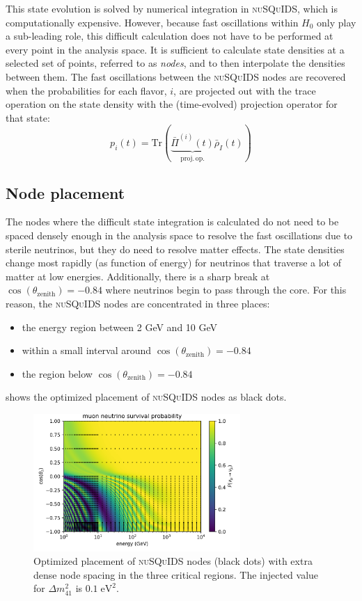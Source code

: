 This state evolution is solved by numerical integration in \textsc{nuSQuIDS}, which is computationally expensive. However, because fast oscillations within $ H_0$ only play a sub-leading role, this difficult calculation does not have to be performed at every point in the analysis space. It is sufficient to calculate state densities at a selected set of points, referred to as \emph{nodes}, and to then interpolate the densities between them. The fast oscillations between the \textsc{nuSQuIDS} nodes are recovered when the probabilities for each flavor, $i$, are projected out with the trace operation on the state density with the (time-evolved) projection operator for that state:
\begin{equation}
p_i(t)=\mathrm{Tr}(\underbrace{\bar{\Pi}^{(i)}(t)}_{\mathrm{proj.\,op.}}\bar{\rho}_I(t))
\end{equation}

\subsection{Node placement}
The nodes where the difficult state integration is calculated do not need to be spaced densely enough in the analysis space to resolve the fast oscillations due to sterile neutrinos, but they do need to resolve matter effects. The state densities change most rapidly (as function of energy) for neutrinos that traverse a lot of matter at low energies. Additionally, there is a sharp break at $\cos(\theta_{\mathrm{zenith}})=-0.84$ where neutrinos begin to pass through the core. For this reason, the \textsc{nuSQuIDS} nodes are concentrated in three places:
\begin{itemize}
    \item the energy region between 2 GeV and 10 GeV
    \item within a small interval around $\cos(\theta_{\mathrm{zenith}})=-0.84$
    \item the region below $\cos(\theta_{\mathrm{zenith}})=-0.84$
\end{itemize}
 shows the optimized placement of \textsc{nuSQuIDS} nodes as black dots.

\begin{figure}
    \centering
    \includegraphics[width=0.7\textwidth]{figures/measurement/sterile_analysis/nusquids/0.1eV_sterile_only_height_avg_optim_nodes.png}
    \caption{Optimized placement of \textsc{nuSQuIDS} nodes (black dots) with extra dense node spacing in the three critical regions. The injected value for $\Delta m^2_{41}$ is $0.1\;\mathrm{eV^2}$.}
    \label{fig:nusquids-nodes}
\end{figure}


